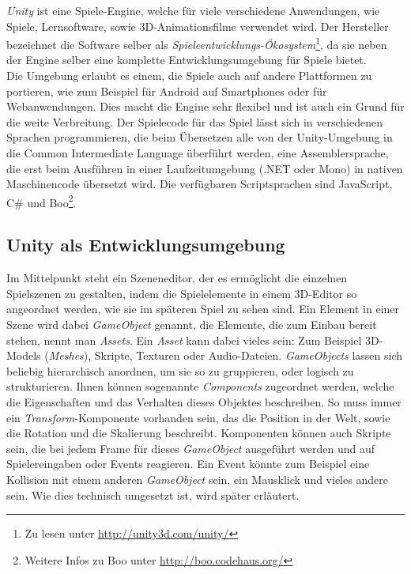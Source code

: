 \textit{Unity} ist eine Spiele-Engine, welche für viele verschiedene Anwendungen, wie Spiele, Lernsoftware, sowie 3D-Animationsfilme verwendet wird. Der Hersteller bezeichnet die Software selber als \textit{Spieleentwicklungs-Ökosystem}\footnote{Zu lesen unter \url{http://unity3d.com/unity/}}, da sie neben der Engine selber eine komplette Entwicklungsumgebung für Spiele bietet.\\
Die Umgebung erlaubt es einem, die Spiele auch auf andere Plattformen zu portieren, wie zum Beispiel für Android auf Smartphones oder für Webanwendungen. Dies macht die Engine sehr flexibel und ist auch ein Grund für die weite Verbreitung. Der Spielecode für das Spiel lässt sich in verschiedenen Sprachen programmieren, die beim Übersetzen alle von der Unity-Umgebung in die Common Intermediate Language überführt werden, eine Assemblersprache, die erst beim Ausführen in einer Laufzeitumgebung (.NET oder Mono) in nativen Maschinencode übersetzt wird. Die verfügbaren Scriptsprachen sind JavaScript, C\# und Boo\footnote{Weitere Infos zu Boo unter \url{http://boo.codehaus.org/}}.

\subsection{Unity als Entwicklungsumgebung} 

Im Mittelpunkt steht ein Szeneneditor, der es ermöglicht die einzelnen Spielszenen zu gestalten, indem die Spielelemente in einem 3D-Editor so angeordnet werden, wie sie im späteren Spiel zu sehen sind. 
Ein Element in einer Szene wird dabei \textit{GameObject} genannt, die Elemente, die zum Einbau bereit stehen, nennt man \textit{Assets}. Ein \textit{Asset} kann dabei vieles sein: Zum Beispiel 3D-Models (\textit{Meshes}), Skripte, Texturen oder Audio-Dateien. \textit{GameObjects} lassen sich beliebig hierarchisch anordnen, um sie so zu gruppieren, oder logisch zu strukturieren. Ihnen können sogenannte \textit{Components} zugeordnet werden, welche die Eigenschaften und das Verhalten dieses Objektes beschreiben. So muss immer ein \textit{Transform}-Komponente vorhanden sein, das die Position in der Welt, sowie die Rotation und die Skalierung beschreibt. Komponenten können auch Skripte sein, die bei jedem Frame für dieses \textit{GameObject} ausgeführt werden und auf Spielereingaben oder Events reagieren. Ein Event könnte zum Beispiel eine Kollision mit einem anderen \textit{GameObject} sein, ein Mausklick und vieles andere sein. Wie dies technisch umgesetzt ist, wird später erläutert.

